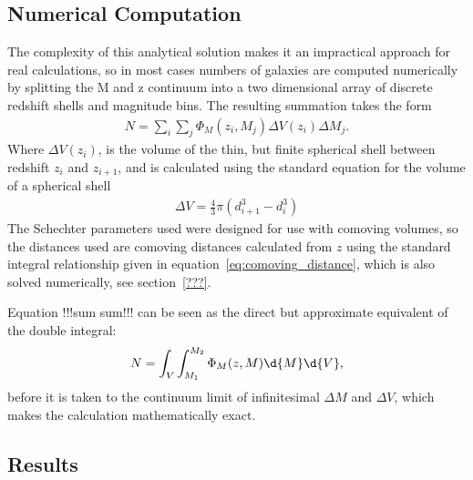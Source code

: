 	\subsection{Numerical Computation} %
	\label{sub:numerical_computation}
		The complexity of this analytical solution makes it an impractical approach for real calculations, so in most cases numbers of galaxies are computed numerically by splitting the M and z continuum into a two dimensional array of discrete redshift shells and magnitude bins. The resulting summation takes the form
		\begin{align}
			N = \sum_i \sum_j \Phi_M(z_i,M_j) \Delta V(z_i) \Delta M_j .
		\end{align}
		Where $\Delta V(z_i)$, is the volume of the thin, but finite spherical shell between redshift $z_i$ and $z_{i+1}$, and is calculated using the standard equation for the volume of a spherical shell
		\begin{align}
			\Delta V = \frac{4}{3} \pi ( d_{i+1}^3 - d_{i}^3)
		\end{align}
		The Schechter parameters used were designed for use with comoving volumes, so the distances used are comoving distances calculated from $z$ using the standard integral relationship given in equation~\ref{eq:comoving_distance}, which is also solved numerically, see section~\ref{???}.

		Equation !!!sum sum!!! can be seen as the direct but approximate equivalent of the double integral:
		\begin{align}
			N = \int_V \int_{M_1}^{M_2} \Phi_M(z,M) \d{M} \d{V} ,
		\end{align}
		before it is taken to the continuum limit of infinitesimal $\Delta M$ and $\Delta V$, which makes the calculation mathematically exact.

	\subsection{Results}	%




